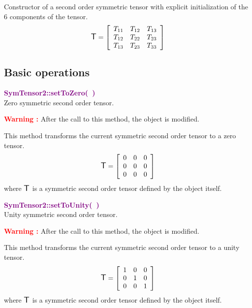 Constructor of a second order symmetric tensor with explicit initialization of the $6$ components of the tensor.
\begin{equation*}
\mbox{\large\ensuremath{\mathsf{T}}}=\left[\begin{array}{ccc}
  T_{11} & T_{12} & T_{13}\\
  T_{12} & T_{22} & T_{23}\\
  T_{13} & T_{23} & T_{33}
  \end{array}\right]
\end{equation*}

\subsection{Basic operations}

\textcolor{purple}{\textbf{SymTensor2::setToZero(~)}}\label{SymTensor2::setToZero()}\\
Zero symmetric second order tensor.

\hspace*{10mm}\textcolor{red}{\textbf{Warning :}} After the call to this method, the object is modified.

This method transforms the current symmetric second order tensor to a zero tensor.
\begin{equation*}
\mbox{\large\ensuremath{\mathsf{T}}}=\left[\begin{array}{ccc}
0 & 0 & 0\\
0 & 0 & 0\\
0 & 0 & 0
\end{array}\right]
\end{equation*}
where $\mbox{\large\ensuremath{\mathsf{T}}}$ is a symmetric second order tensor defined by the object itself.

\textcolor{purple}{\textbf{SymTensor2::setToUnity(~)}}\label{SymTensor2::setToUnity()}\\
Unity symmetric second order tensor.

\hspace*{10mm}\textcolor{red}{\textbf{Warning :}} After the call to this method, the object is modified.

This method transforms the current symmetric second order tensor to a unity tensor.
\begin{equation*}
\mbox{\large\ensuremath{\mathsf{T}}}=\left[\begin{array}{ccc}
1&0&0\\
0&1&0\\
0&0&1
\end{array}\right]
\end{equation*}
where $\mbox{\large\ensuremath{\mathsf{T}}}$ is a symmetric second order tensor defined by the object itself.

